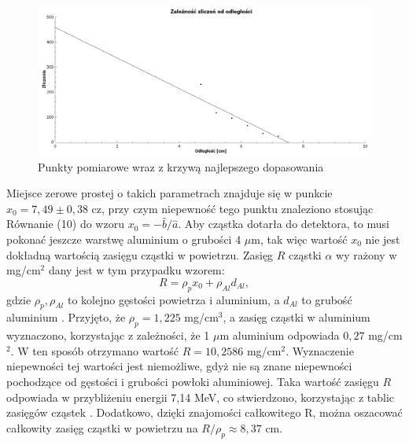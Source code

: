 \documentclass[10pt,a4paper]{article}
\begin{document}
\begin{figure}[h!]
\includegraphics[width=12cm]{wyka} 
\centering
\caption{Punkty pomiarowe wraz z krzywą najlepszego dopasowania}
\label{p2}
\end{figure}

Miejsce zerowe prostej o takich parametrach znajduje się w punkcie $x_{0}=7,49\pm0,38$ cz, przy czym niepewność tego punktu znaleziono stosując Równanie (10) do wzoru $x_{0}=-\hat{b}/\hat{a}$. Aby cząstka dotarła do detektora, to musi pokonać jeszcze warstwę aluminium o grubości 4 $\mu$m, tak więc wartość $x_{0}$ nie jest dokładną wartością zasięgu cząstki w powietrzu. Zasięg $R$ cząstki $\alpha$ wy rażony w mg/cm$^2$ dany jest w tym przypadku wzorem:
\begin{equation}
R=\rho_{p}x_{0}+\rho_{Al} d_{Al},
\end{equation}
gdzie $\rho_{p}, \rho_{Al}$ to kolejno gęstości powietrza i aluminium, a $d_{Al}$ to grubość aluminium \cite{nuc1}. Przyjęto, że $\rho_{p}=1,225$ mg/cm$^3$, a zasięg cząstki w aluminium wyznaczono, korzystając z zależności, że 1 $\mu$m aluminium odpowiada $0,27$ mg/cm$^2$. 
W ten sposób otrzymano wartość $R=10,2586$ mg/cm$^2$. Wyznaczenie niepewności tej wartości jest niemożliwe, gdyż nie są znane niepewności pochodzące od gęstości i grubości powłoki aluminiowej. Taka wartość zasięgu $R$ odpowiada w przybliżeniu energii 7,14 MeV, co stwierdzono, korzystając z tablic zasięgów cząstek \cite{zas}. 
Dodatkowo, dzięki znajomości całkowitego R, można oszacować całkowity zasięg cząstki w powietrzu na $R/\rho_{p}\approx8,37$ cm. 
\end{document}
